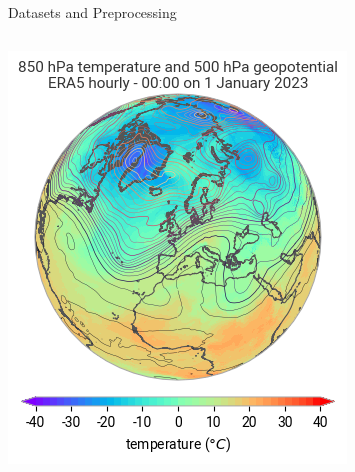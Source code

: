 \documentclass[footline=authortitle]{beamer}
\begin{document}
\begin{frame}{Datasets and Preprocessing}
\begin{columns}
        \begin{column}{0.35\textwidth}
            \centering
            \includegraphics[width=\linewidth]{images/overview-detail_67e6d1d5ac470ee33ae510a76a2fe3c1c67a7f1fdd4c040a333969fe0b11f76f.png}
        \end{column}
    \end{columns}

\end{frame}
\end{document}

